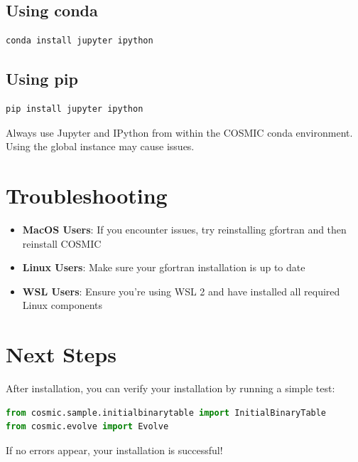 \documentclass[a4paper,11pt]{article}
\begin{document}
\subsection{Using conda}
\begin{lstlisting}[language=bash]
conda install jupyter ipython
\end{lstlisting}

\subsection{Using pip}
\begin{lstlisting}[language=bash]
pip install jupyter ipython
\end{lstlisting}

\begin{tcolorbox}[title=Important Note]
Always use Jupyter and IPython from within the COSMIC conda environment. Using the global instance may cause issues.
\end{tcolorbox}

\section{Troubleshooting}
\begin{itemize}
    \item \textbf{MacOS Users}: If you encounter issues, try reinstalling gfortran and then reinstall COSMIC
    \item \textbf{Linux Users}: Make sure your gfortran installation is up to date
    \item \textbf{WSL Users}: Ensure you're using WSL 2 and have installed all required Linux components
\end{itemize}

\section{Next Steps}
After installation, you can verify your installation by running a simple test:
\begin{lstlisting}[language=python]
from cosmic.sample.initialbinarytable import InitialBinaryTable
from cosmic.evolve import Evolve
\end{lstlisting}

If no errors appear, your installation is successful!
\end{document}
